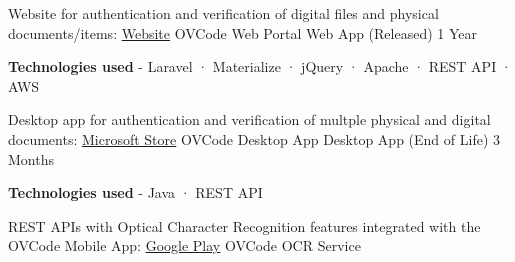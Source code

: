 \begin{cventries}
{\begin{cvitems}
      \end{cvitems}
    }
  \cventry
    {Website for authentication and verification of digital files and physical documents/items: \href{https://ovcode.com/}{Website} } %
    {OVCode Web Portal} %
    {Web App (Released)} %
    {1 Year} %
    {
      \begin{cvitems} %
        \item {\textbf{Technologies used} \hspace{0.03cm} - \hspace{0.03cm} Laravel \hspace{0.03cm} · \hspace{0.03cm} Materialize \hspace{0.03cm} · \hspace{0.03cm} jQuery \hspace{0.03cm} · \hspace{0.03cm} Apache \hspace{0.03cm} · \hspace{0.03cm} REST API \hspace{0.03cm} · \hspace{0.03cm} AWS \\}
      \end{cvitems}
    }
  \cventry
    {Desktop app for authentication and verification of multple physical and digital documents: \href{https://www.microsoft.com/en-us/p/ovcode/9p2tlm03m56x}{Microsoft Store}} %
    {OVCode Desktop App} %
    {Desktop App (End of Life)} %
    {3 Months} %
    {
      \begin{cvitems} %
        \item {\textbf{Technologies used} \hspace{0.03cm} - \hspace{0.03cm} Java \hspace{0.03cm} · \hspace{0.03cm} REST API \\}
      \end{cvitems}
    }
  \cventry
    {REST APIs with Optical Character Recognition features integrated with the OVCode Mobile App: \href{https://play.google.com/store/apps/details?id=com.nextix.ovcode}{Google Play}} %
    {OVCode OCR Service} %

\end{cventries}

